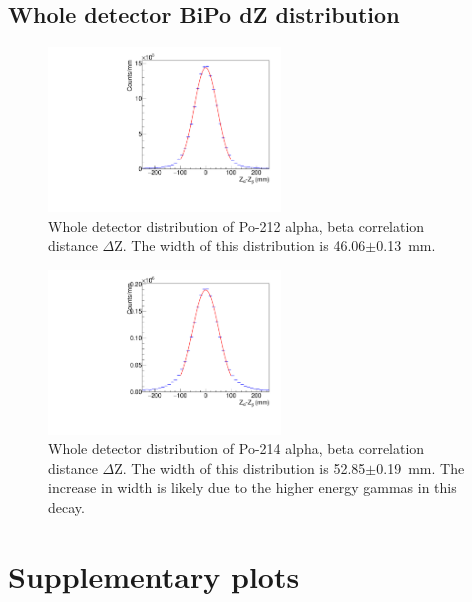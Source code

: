 \subsection{Whole detector BiPo dZ distribution}
\begin{figure}[!h]
\centering
\includegraphics[width=0.55\textwidth]{figures/PubBiPo212dZ.pdf}
\caption{\label{fig:dZ212}Whole detector distribution of Po-212 alpha, beta correlation distance $\Delta$Z. The width of this distribution is 46.06$\pm$0.13~mm.}
\end{figure}
\begin{figure}[!h]
\centering
\includegraphics[width=0.55\textwidth]{figures/PubBiPo214dZ.pdf}
\caption{\label{fig:dZ214}Whole detector distribution of Po-214 alpha, beta correlation distance $\Delta$Z. The width of this distribution is 52.85$\pm$0.19~mm. The increase in width is likely due to the higher energy gammas in this decay.}
\end{figure}
\newpage

\FloatBarrier

\section{Supplementary plots\label{sec:supp}}

